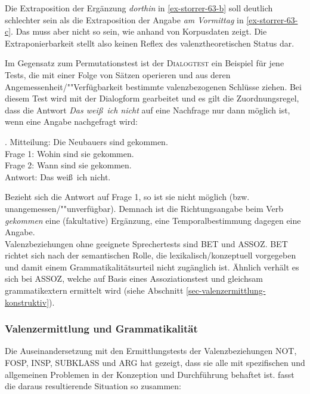 Die Extraposition der Ergänzung {\it dorthin} in \ref{ex-storrer-63-b} soll deutlich schlechter sein als die Extraposition der Angabe {\it am Vormittag} in \ref{ex-storrer-63-c}. Das muss aber nicht so sein, wie \citet[Abschnitt~13.1.1]{Mueller:99} anhand von Korpusdaten zeigt. Die Extraponierbarkeit stellt also keinen Reflex des valenztheoretischen Status dar.

Im Gegensatz zum Permutationstest ist der \textsc{Dialogtest} ein Beispiel für jene Tests, die mit einer Folge von Sätzen operieren und aus deren Angemessenheit/""Verfügbarkeit bestimmte valenzbezogenen Schlüsse ziehen. Bei diesem Test wird mit der Dialogform gearbeitet und es gilt die Zuordnungsregel, dass die Antwort \textit{Das wei\ss \ ich nicht} auf eine Nachfrage nur dann möglich ist, wenn eine Angabe nachgefragt wird:

\ex. 
Mitteilung: Die Neubauers sind gekommen. \\
Frage 1: Wohin sind sie gekommen. \\
Frage 2: Wann sind sie gekommen. \\
Antwort: Das wei\ss \ ich nicht. \\
\citep[68]{Storrer:92}

Bezieht sich die Antwort auf Frage 1, so ist sie nicht möglich (bzw. unangemessen/""unverfügbar). Demnach ist die Richtungsangabe beim Verb {\it gekommen} eine (fakultative) Ergänzung, eine Temporalbestimmung dagegen eine Angabe. \\


Valenzbeziehungen ohne geeignete Sprechertests sind BET und ASSOZ. BET richtet sich nach der semantischen Rolle, die lexikalisch/konzeptuell vorgegeben und damit einem Grammatikalitätsurteil nicht zugänglich ist. Ähnlich verhält es sich bei ASSOZ, welche auf Basis eines Assoziationstest und gleichsam grammatikextern ermittelt wird (siehe Abschnitt \ref{sec-valenzermittlung-konstruktiv}).

\subsubsection*{Valenzermittlung und Grammatikalität}

Die Auseinandersetzung mit den Ermittlungstests der Valenzbeziehungen NOT, FOSP, INSP, SUBKLASS und ARG hat gezeigt, dass sie alle mit spezifischen und allgemeinen Problemen in der Konzeption und Durchführung behaftet ist. \citet[215]{Storrer:92} fasst die daraus resultierende Situation so zusammen: 

